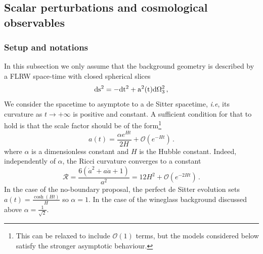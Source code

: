 \documentclass[a4paper,11pt]{article}
\begin{document}
\subsection{Scalar perturbations and  cosmological observables}\label{generalresults}

\subsubsection{Setup and notations}
In this subsection we only assume that the background geometry is described by a FLRW space-time with closed spherical slices
\begin{equation}\label{eq:Lor_metric}
    \rm{d}s^2 = -\rm{d}t^2 + a^2(t)\rm{d}\Omega_3^2\,,
\end{equation}
We consider the spacetime to asymptote to a de Sitter spacetime, \textit{i.e}, its curvature as $t \to +\infty$ is positive and constant. A sufficient condition for that to hold is that the scale factor should be of the form\footnote{This can be relaxed to include $\mathcal{O}(1)$ terms, but the models considered below satisfy the stronger asymptotic behaviour.}
\begin{equation}\label{eq:ansatzs_scalefactor}
    a(t) = \frac{\alpha e^{Ht}}{2H} + \mathcal{O}(e^{-Ht})\,.
\end{equation}
where $\alpha$ is a dimensionless constant and $H$ is the Hubble constant. Indeed, independently of $\alpha$, the Ricci curvature converges to a constant
\begin{equation}
    \mathcal{R} = \frac{6(\dot{a}^2+ a \ddot{a}+1)}{a^2} = 12 H^2 + \mathcal{\mathcal{O}}(e^{-2Ht})\,.
\end{equation}
In the case of the no-boundary proposal, the perfect de Sitter evolution sets $a(t)=\frac{\cosh(Ht)}{H}$ so $\alpha =1$. In the case of the wineglass background discussed above  $\alpha = \frac{1}{\sqrt{2}}$.
\end{document}
